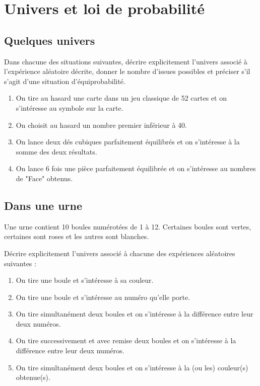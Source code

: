 \documentclass[oneside,12pt]{article}          %
\begin{document}
\section{Univers et loi de probabilité}

\subsection{Quelques univers}
Dans chacune des situations suivantes, décrire explicitement l'univers associé à l'expérience aléatoire décrite, donner le nombre d'issues possibles et préciser s'il s'agit d'une situation d'équiprobabilité.
\begin{enumerate}
	\item On tire au hasard une carte dans un jeu classique de 52 cartes et on s'intéresse au symbole sur la carte.
	\item On choisit au hasard un nombre premier inférieur à 40.
	\item On lance deux dés cubiques parfaitement équilibrés et on s'intéresse à la somme des deux résultats.
	\item On lance 6 fois une pièce parfaitement équilibrée et on s'intéresse au nombres de "Face" obtenus.
\end{enumerate}



\subsection{Dans une urne}
Une urne contient 10 boules numérotées de 1 à 12. Certaines boules sont vertes, certaines sont roses et les autres sont blanches.

Décrire explicitement l'univers associé à chacune des expériences aléatoires suivantes :
\begin{enumerate}
	\item On tire une boule et s'intéresse à sa couleur.
	\item On tire une boule et s'intéresse au numéro qu'elle porte.
	\item On tire simultanément deux boules et on s'intéresse à la différence entre leur deux numéros.
	\item On tire successivement et avec remise deux boules et on s'intéresse à la différence entre leur deux numéros.
	\item On tire simultanément deux boules et on s'intéresse à la (ou les) couleur(s) obtenue(s).
\end{enumerate}
\end{document}
